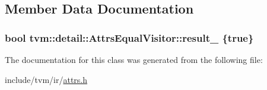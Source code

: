 \subsection{Member Data Documentation}
\subsubsection[{\texorpdfstring{result\+\_\+}{result_}}]{\setlength{\rightskip}{0pt plus 5cm}bool tvm\+::detail\+::\+Attrs\+Equal\+Visitor\+::result\+\_\+ \{true\}}\hypertarget{classtvm_1_1detail_1_1AttrsEqualVisitor_a3903dd9e71e23344f1a807644d43707f}{}\label{classtvm_1_1detail_1_1AttrsEqualVisitor_a3903dd9e71e23344f1a807644d43707f}


The documentation for this class was generated from the following file\+:\begin{DoxyCompactItemize}
\item 
include/tvm/ir/\hyperlink{ir_2attrs_8h}{attrs.\+h}\end{DoxyCompactItemize}

